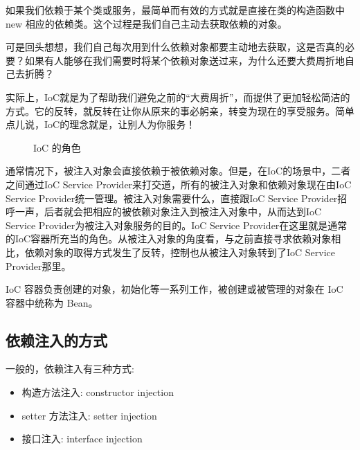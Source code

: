如果我们依赖于某个类或服务，最简单而有效的方式就是直接在类的构造函数中 new 相应的依赖类。这个过程是我们自己主动去获取依赖的对象。

可是回头想想，我们自己每次用到什么依赖对象都要主动地去获取，这是否真的必要？如果有人能够在我们需要时将某个依赖对象送过来，为什么还要大费周折地自己去折腾？

实际上，IoC就是为了帮助我们避免之前的“大费周折”，而提供了更加轻松简洁的方式。它的反转，就反转在让你从原来的事必躬亲，转变为现在的享受服务。简单点儿说，IoC的理念就是，让别人为你服务！

\begin{figure}[H]
    \small
    \centering
    \caption{IoC 的角色}
    \label{fig:IoC 的角色}
\end{figure}

通常情况下，被注入对象会直接依赖于被依赖对象。但是，在IoC的场景中，二者之间通过IoC Service Provider来打交道，所有的被注入对象和依赖对象现在由IoC Service Provider统一管理。被注入对象需要什么，直接跟IoC Service Provider招呼一声，后者就会把相应的被依赖对象注入到被注入对象中，从而达到IoC Service Provider为被注入对象服务的目的。IoC Service Provider在这里就是通常的IoC容器所充当的角色。从被注入对象的角度看，与之前直接寻求依赖对象相比，依赖对象的取得方式发生了反转，控制也从被注入对象转到了IoC Service Provider那里。

IoC 容器负责创建的对象，初始化等一系列工作，被创建或被管理的对象在 IoC 容器中统称为 Bean。

\subsection{依赖注入的方式}

一般的，依赖注入有三种方式:
\begin{itemize}
    \item 构造方法注入: constructor injection
    \item setter 方法注入: setter injection
    \item 接口注入: interface injection
\end{itemize}


